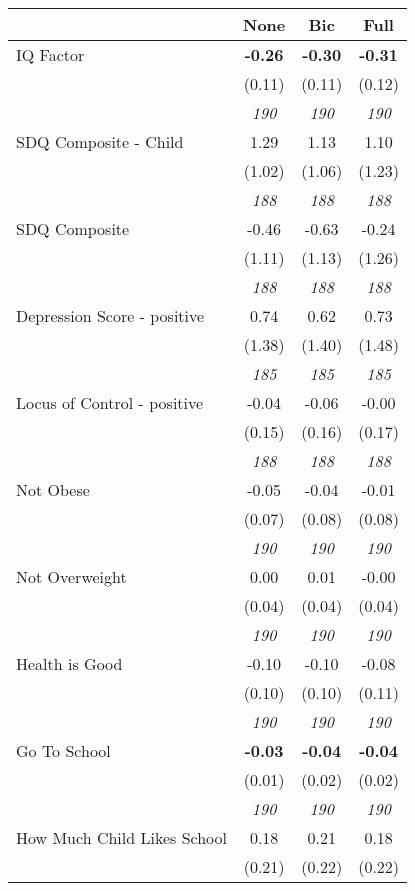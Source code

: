\begin{tabular}{l c c c}
\toprule
 & None & Bic & Full \\
\midrule
IQ Factor & \textbf{ -0.26 } & \textbf{ -0.30 } & \textbf{ -0.31 } \\
& (0.11) & (0.11) & (0.12) \\
& \textit{ 190 } & \textit{ 190 } & \textit{ 190 } \\
SDQ Composite - Child & 1.29 & 1.13 & 1.10 \\
& (1.02) & (1.06) & (1.23) \\
& \textit{ 188 } & \textit{ 188 } & \textit{ 188 } \\
SDQ Composite & -0.46 & -0.63 & -0.24 \\
& (1.11) & (1.13) & (1.26) \\
& \textit{ 188 } & \textit{ 188 } & \textit{ 188 } \\
Depression Score - positive & 0.74 & 0.62 & 0.73 \\
& (1.38) & (1.40) & (1.48) \\
& \textit{ 185 } & \textit{ 185 } & \textit{ 185 } \\
Locus of Control - positive & -0.04 & -0.06 & -0.00 \\
& (0.15) & (0.16) & (0.17) \\
& \textit{ 188 } & \textit{ 188 } & \textit{ 188 } \\
Not Obese & -0.05 & -0.04 & -0.01 \\
& (0.07) & (0.08) & (0.08) \\
& \textit{ 190 } & \textit{ 190 } & \textit{ 190 } \\
Not Overweight & 0.00 & 0.01 & -0.00 \\
& (0.04) & (0.04) & (0.04) \\
& \textit{ 190 } & \textit{ 190 } & \textit{ 190 } \\
Health is Good & -0.10 & -0.10 & -0.08 \\
& (0.10) & (0.10) & (0.11) \\
& \textit{ 190 } & \textit{ 190 } & \textit{ 190 } \\
Go To School & \textbf{ -0.03 } & \textbf{ -0.04 } & \textbf{ -0.04 } \\
& (0.01) & (0.02) & (0.02) \\
& \textit{ 190 } & \textit{ 190 } & \textit{ 190 } \\
How Much Child Likes School & 0.18 & 0.21 & 0.18 \\
& (0.21) & (0.22) & (0.22) \\

\end{tabular}
